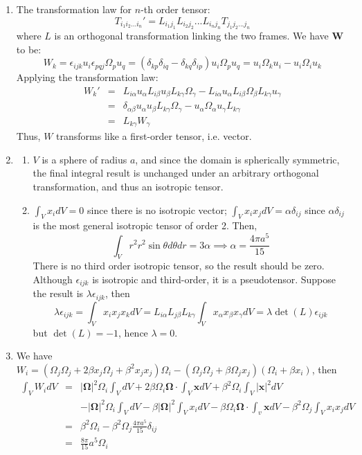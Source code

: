\documentclass[a4paper]{article}
\begin{document}
\begin{ans}\leavevmode
\begin{enumerate}[label=(\alph*)]
\item The transformation law for $n$-th order tensor:
$$T_{i_1i_2...i_n}'=L_{i_1j_1}L_{i_2j_2}...L_{i_nj_n}T_{j_1j_2...j_n}$$
where $L$ is an orthogonal transformation linking the two frames. We have $\mathbf{W}$ to be:
$$W_k=\epsilon_{ijk}u_i\epsilon_{pqj}\Omega_pu_q=(\delta_{kp}\delta_{iq}-\delta_{kq}\delta_{ip})u_i\Omega_pu_q=u_i\Omega_ku_i-u_i\Omega_iu_k$$
Applying the transformation law:
\begin{eqnarray}
W_k'&=&L_{i\alpha}u_\alpha L_{i\beta}u_\beta L_{k\gamma}\Omega_\gamma-L_{i\alpha}u_\alpha L_{i\beta}\Omega_\beta L_{k\gamma}u_\gamma\nonumber\\&=&\delta_{\alpha\beta}u_\alpha u_\beta L_{k\gamma}\Omega_\gamma-u_\alpha\Omega_\alpha u_\gamma L_{k\gamma}\nonumber\\&=&L_{k\gamma}W_\gamma\nonumber
\end{eqnarray}
Thus, $W$ transforms like a first-order tensor, i.e. vector.
\item 
\begin{enumerate}[label=(\roman*)]
\item $V$ is a sphere of radius $a$, and since the domain is spherically symmetric, the final integral result is unchanged under an arbitrary orthogonal transformation, and thus an isotropic tensor.
\item $\int_Vx_idV=0$ since there is no isotropic vector; $\int_Vx_ix_jdV=\alpha\delta_{ij}$ since $\alpha\delta_{ij}$ is the most general isotropic tensor of order 2. Then,
$$\int_Vr^2r^2\sin\theta d\theta dr=3\alpha\implies\alpha=\frac{4\pi a^5}{15}$$
There is no third order isotropic tensor, so the result should be zero. Although $\epsilon_{ijk}$ is isotropic and third-order, it is a pseudotensor. Suppose the result is $\lambda\epsilon_{ijk}$, then
$$\lambda\epsilon_{ijk}=\int_Vx_ix_jx_kdV=L_{i\alpha}L_{j\beta}L_{k\gamma}\int_Vx_\alpha x_\beta x_\gamma dV=\lambda\det(L)\epsilon_{ijk}$$
but $\det(L)=-1$, hence $\lambda=0$.
\end{enumerate}
\item We have $W_i=(\Omega_j\Omega_j+2\beta x_j\Omega_j+\beta^2x_jx_j)\Omega_i-(\Omega_j\Omega_j+\beta\Omega_jx_j)(\Omega_i+\beta x_i)$, then
\begin{eqnarray}
\int_VW_idV&=&|\boldsymbol{\Omega}|^2\Omega_i\int_VdV+2\beta\Omega_i\boldsymbol{\Omega}\cdot\int_V\mathbf{x}dV+\beta^2\Omega_i\int_V|\mathbf{x}|^2dV\nonumber\\&&-|\boldsymbol{\Omega}|^2\Omega_i\int_VdV-\beta|\boldsymbol{\Omega}|^2\int_Vx_idV-\beta\Omega_i\boldsymbol{\Omega}\cdot\int_v\mathbf{x}dV-\beta^2\Omega_j\int_Vx_ix_jdV\nonumber\\&=&\beta^2\Omega_i-\beta^2\Omega_j\frac{4\pi a^5}{15}\delta_{ij}\nonumber\\&=&\frac{8\pi}{15}a^5\Omega_i\nonumber
\end{eqnarray}
\end{enumerate}
\end{ans}
\end{document}
